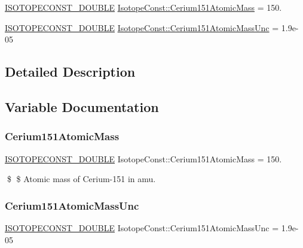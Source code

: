 \begin{DoxyCompactItemize}
\item 
\mbox{\hyperlink{group___isotope_const-_macros_ga8f45a7272ce02c0b4c65c44636ed719a}{I\+S\+O\+T\+O\+P\+E\+C\+O\+N\+S\+T\+\_\+\+D\+O\+U\+B\+LE}} \mbox{\hyperlink{group___isotope_const-_cerium-_ce151_ga60a086856d2b8baa5d4c166d254e8d96}{Isotope\+Const\+::\+Cerium151\+Atomic\+Mass}} = 150.
\item 
\mbox{\hyperlink{group___isotope_const-_macros_ga8f45a7272ce02c0b4c65c44636ed719a}{I\+S\+O\+T\+O\+P\+E\+C\+O\+N\+S\+T\+\_\+\+D\+O\+U\+B\+LE}} \mbox{\hyperlink{group___isotope_const-_cerium-_ce151_ga01f17446585c4354858731f23b470c8d}{Isotope\+Const\+::\+Cerium151\+Atomic\+Mass\+Unc}} = 1.\+9e-\/05
\end{DoxyCompactItemize}


\subsection{Detailed Description}


\subsection{Variable Documentation}
\mbox{\label{group___isotope_const-_cerium-_ce151_ga60a086856d2b8baa5d4c166d254e8d96}} 
\subsubsection{\texorpdfstring{Cerium151\+Atomic\+Mass}{Cerium151AtomicMass}}
{\footnotesize\ttfamily \mbox{\hyperlink{group___isotope_const-_macros_ga8f45a7272ce02c0b4c65c44636ed719a}{I\+S\+O\+T\+O\+P\+E\+C\+O\+N\+S\+T\+\_\+\+D\+O\+U\+B\+LE}} Isotope\+Const\+::\+Cerium151\+Atomic\+Mass = 150.}

\$ \$ Atomic mass of Cerium-\/151 in amu. \mbox{\label{group___isotope_const-_cerium-_ce151_ga01f17446585c4354858731f23b470c8d}} 
\subsubsection{\texorpdfstring{Cerium151\+Atomic\+Mass\+Unc}{Cerium151AtomicMassUnc}}
{\footnotesize\ttfamily \mbox{\hyperlink{group___isotope_const-_macros_ga8f45a7272ce02c0b4c65c44636ed719a}{I\+S\+O\+T\+O\+P\+E\+C\+O\+N\+S\+T\+\_\+\+D\+O\+U\+B\+LE}} Isotope\+Const\+::\+Cerium151\+Atomic\+Mass\+Unc = 1.\+9e-\/05}

